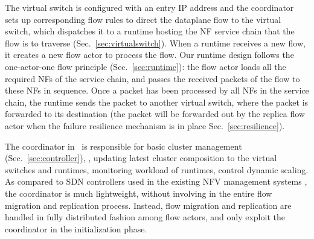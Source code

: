 The virtual switch is configured with an entry IP address and the coordinator sets up corresponding flow rules to direct the dataplane flow to the virtual switch,%
 which dispatches it to a runtime hosting the NF service chain that the flow is to traverse (Sec.~\ref{sec:virtualswitch}). When a runtime receives a new flow, it creates a new flow actor to process the flow. Our runtime design follows the one-actor-one flow principle (Sec.~\ref{sec:runtime}): the flow actor loads all the required NFs of the service chain, and passes the received packets of the flow to these NFs in sequence. %
 Once a packet has been processed by all NFs in the service chain, the runtime sends the packet to another virtual switch,
where the packet is forwarded to its destination (the packet will be forwarded out by the replica flow actor when the failure resilience mechanism is in place Sec.~\ref{sec:resilience}).




The coordinator in \nfactor~is responsible for basic cluster management (Sec.~\ref{sec:controller}), \eg, updating latest cluster composition to the virtual switches and runtimes, monitoring workload of runtimes, control dynamic scaling. %
As compared to SDN controllers used in the existing NFV management systems \cite{gember2015opennf, rajagopalan2013split}%
, the coordinator is much lightweight, without involving in the entire flow migration and replication process.%
 Instead, flow migration and replication are handled in fully distributed fashion among flow actors, and only exploit the coordinator in the initialization phase.

